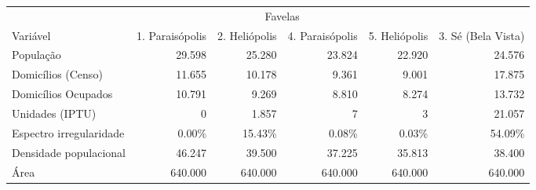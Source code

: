 \begingroup
\fontsize{6.8pt}{8.1pt}\selectfont
\begin{longtable}{lrrrrr}
\toprule
 & \multicolumn{4}{c}{Favelas} &  \\ 
\cmidrule(lr){2-5}
Variável & 1. Paraisópolis & 2. Heliópolis  & 4. Paraisópolis & 5. Heliópolis & 3. Sé (Bela Vista) \\ 
\midrule\addlinespace[2.5pt]
População & 29.598 & 25.280 & 23.824 & 22.920 & 24.576 \\ 
Domicílios (Censo) & 11.655 & 10.178 & 9.361 & 9.001 & 17.875 \\ 
Domicílios Ocupados & 10.791 & 9.269 & 8.810 & 8.274 & 13.732 \\ 
Unidades (IPTU) & 0 & 1.857 & 7 & 3 & 21.057 \\ 
Espectro irregularidade & 0.00\% & 15.43\% & 0.08\% & 0.03\% & 54.09\% \\ 
Densidade populacional & 46.247 & 39.500 & 37.225 & 35.813 & 38.400 \\ 
Área & 640.000 & 640.000 & 640.000 & 640.000 & 640.000 \\ 
\bottomrule
\end{longtable}
\endgroup

